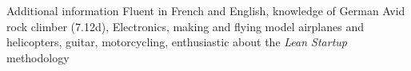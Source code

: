 \begin{rubric}{Additional information}
\entry*[Languages]%
  Fluent in French and English, knowledge of German
%
%
\entry*[Hobbies]%
  Avid rock climber (7.12d), Electronics,
  making and flying model airplanes and helicopters,
  guitar,
  motorcycling,
  enthusiastic about the \textit{Lean Startup} methodology
%
%
\end{rubric}
